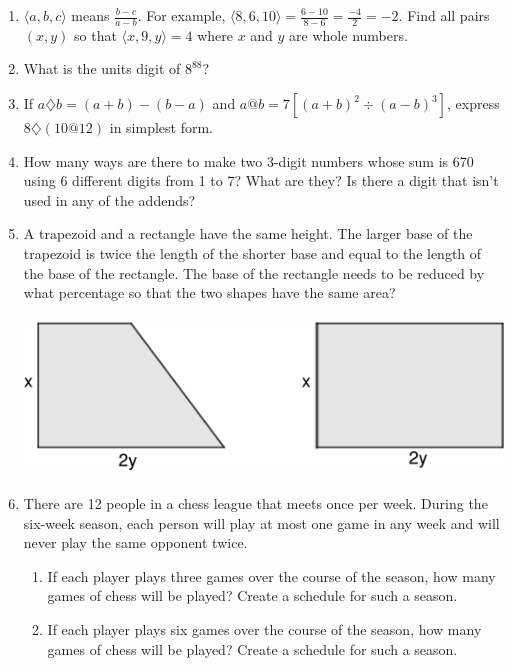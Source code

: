 \begin{enumerate}
	\item $\langle a,b,c\rangle$ means ${\displaystyle \frac{b-c}{a-b}}$. For example, ${\displaystyle \langle8,6,10\rangle=\frac{6-10}{8-6}=\frac{-4}{2}=-2}$. Find all pairs $(x,y)$ so that $\langle x,9,y\rangle=4$ where $x$ and $y$ are whole numbers.
	
	\item What is the units digit of $8^{88}$?
	
	\item If $a\diamondsuit b=(a+b)-(b-a)$ and $a@b=7\left[(a+b)^{2}\div(a-b)^{3}\right]$, express $8\diamondsuit(10@12)$ in simplest form.
	
	\item How many ways are there to make two 3-digit numbers whose sum is 670 using 6 different digits from 1 to 7? What are they? Is there a digit that isn't used in any of the addends?
	
	\item A trapezoid and a rectangle have the same height. The larger base of the trapezoid is twice the length of the shorter base and equal to the length of the base of the rectangle. The base of the rectangle needs to be reduced by what percentage so that the two shapes have the same area?
	\begin{center}
		\includegraphics[height=4.2cm]{images/FinalProject-fig01.pdf}\par
	\end{center}
	
	\item There are 12 people in a chess league that meets once per week. During the six-week season, each person will play at most one game in any week and will never play the same opponent twice.
	\begin{enumerate}
		\item If each player plays three games over the course of the season, how many games of chess will be played? Create a schedule for such a season.
		\item If each player plays six games over the course of the season, how many games of chess will be played? Create a schedule for such a season.
	\end{enumerate}
\end{enumerate}


